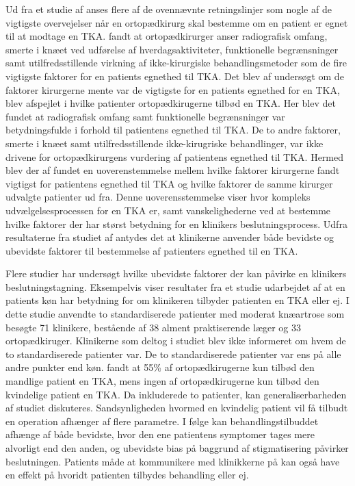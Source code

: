 Ud fra et studie af \cite{skou2016} anses flere af de ovennævnte retningslinjer som nogle af de vigtigste overvejelser når en ortopædkirurg skal bestemme om en patient er egnet til at modtage en TKA. \cite{skou2016} fandt at ortopædkirurger anser radiografisk omfang, smerte i knæet ved udførelse af hverdagsaktiviteter, funktionelle begrænsninger samt utilfredsstillende virkning af ikke-kirurgiske behandlingsmetoder som de fire vigtigste faktorer for en patients egnethed til TKA. Det blev af \cite{skou2016} undersøgt om de faktorer kirurgerne mente var de vigtigste for en patients egnethed for en TKA, blev afspejlet i hvilke patienter ortopædkirugerne tilbød en TKA. Her blev det fundet at radiografisk omfang samt funktionelle begrænsninger var betydningsfulde i forhold til patientens egnethed til TKA. De to andre faktorer, smerte i knæet samt utilfredsstillende ikke-kirugriske behandlinger, var ikke drivene for ortopædkirurgens vurdering af patientens egnethed til TKA. Hermed blev der af \cite{skou2016} fundet en uoverenstemmelse mellem hvilke faktorer kirurgerne fandt vigtigst for patientens egnethed til TKA og hvilke faktorer de samme kirurger udvalgte patienter ud fra. Denne uoverensstemmelse viser hvor kompleks udvælgelsesprocessen for en TKA er, samt vanskelighederne ved at bestemme hvilke faktorer der har størst betydning for en klinikers beslutningsprocess. Udfra resultaterne fra studiet af \cite{skou2016} antydes det at klinikerne anvender både bevidste og ubevidste faktorer til bestemmelse af patienters egnethed til en TKA.    


Flere studier har undersøgt hvilke ubevidste faktorer der kan påvirke en klinikers beslutningstagning. Eksempelvis viser resultater fra et studie udarbejdet af \cite{borkhoff2008} at en patients køn har betydning for om klinikeren tilbyder patienten en TKA eller ej. I dette studie anvendte \cite{borkhoff2008} to standardiserede patienter med moderat knæartrose som besøgte 71 klinikere, bestående af 38 alment praktiserende læger og 33 ortopædkiruger. Klinikerne som deltog i studiet blev ikke informeret om hvem de to standardiserede patienter var. De to standardiserede patienter var ens på alle andre punkter end køn. \cite{borkhoff2008} fandt at 55\% af ortopædkirugerne  kun tilbød den mandlige patient en TKA, mens ingen af ortopædkirugerne  kun tilbød den kvindelige patient en TKA. Da   inkluderede to patienter, kan generaliserbarheden af studiet diskuteres. Sandsynligheden hvormed en kvindelig patient vil få tilbudt en operation afhænger af flere parametre. I følge  kan
behandlingstilbuddet afhænge af både bevidste, hvor den ene patientens symptomer tages mere alvorligt end den anden, og ubevidste bias på baggrund af stigmatisering påvirker beslutningen. Patients måde at kommunikere med klinikkerne på kan også have en effekt på hvoridt patienten tilbydes behandling eller ej. \cite{borkhoff2008}



